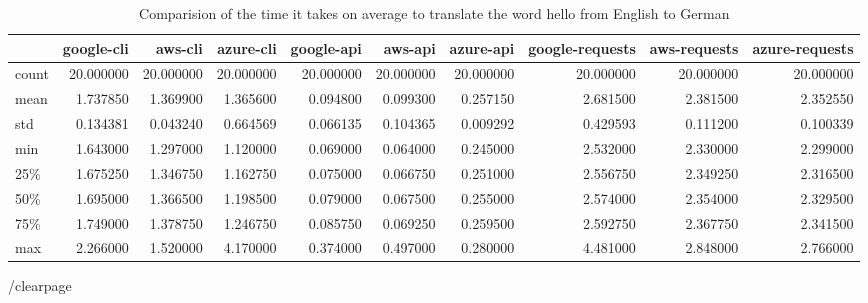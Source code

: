 \begin{table}[htb]

\caption{Comparision of the time it takes on average to translate the word hello from English to German}

\begin{tabular}{lrrrrrrrrr}
 & google-cli & aws-cli & azure-cli & google-api & aws-api & azure-api & google-requests & aws-requests & azure-requests \\
 \hline
count & 20.000000 & 20.000000 & 20.000000 & 20.000000 & 20.000000 & 20.000000 & 20.000000 & 20.000000 & 20.000000 \\
mean & 1.737850 & 1.369900 & 1.365600 & 0.094800 & 0.099300 & 0.257150 & 2.681500 & 2.381500 & 2.352550 \\
std & 0.134381 & 0.043240 & 0.664569 & 0.066135 & 0.104365 & 0.009292 & 0.429593 & 0.111200 & 0.100339 \\
min & 1.643000 & 1.297000 & 1.120000 & 0.069000 & 0.064000 & 0.245000 & 2.532000 & 2.330000 & 2.299000 \\
25\% & 1.675250 & 1.346750 & 1.162750 & 0.075000 & 0.066750 & 0.251000 & 2.556750 & 2.349250 & 2.316500 \\
50\% & 1.695000 & 1.366500 & 1.198500 & 0.079000 & 0.067500 & 0.255000 & 2.574000 & 2.354000 & 2.329500 \\
75\% & 1.749000 & 1.378750 & 1.246750 & 0.085750 & 0.069250 & 0.259500 & 2.592750 & 2.367750 & 2.341500 \\
max & 2.266000 & 1.520000 & 4.170000 & 0.374000 & 0.497000 & 0.280000 & 4.481000 & 2.848000 & 2.766000 \\
\hline
\end{tabular}
\end{table}

/clearpage
